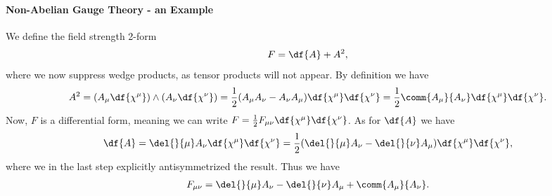 \paragraph{Non-Abelian Gauge Theory - an Example}
We define the field strength 2-form
\begin{align*}
	F = \df{A} + A^{2},
\end{align*}
where we now suppress wedge products, as tensor products will not appear. By definition we have
\begin{align*}
	A^{2} = (A_{\mu}\df{\chi^{\mu}})\wedge(A_{\nu}\df{\chi^{\nu}}) = \frac{1}{2}(A_{\mu}A_{\nu} - A_{\nu}A_{\mu})\df{\chi^{\mu}}\df{\chi^{\nu}} = \frac{1}{2}\comm{A_{\mu}}{A_{\nu}}\df{\chi^{\mu}}\df{\chi^{\nu}}.
\end{align*}
Now, $F$ is a differential form, meaning we can write $F = \frac{1}{2}F_{\mu\nu}\df{\chi^{\mu}}\df{\chi^{\nu}}$. As for $\df{A}$ we have
\begin{align*}
	\df{A} = \del{}{\mu}A_{\nu}\df{\chi^{\mu}}\df{\chi^{\nu}} = \frac{1}{2}(\del{}{\mu}A_{\nu} - \del{}{\nu}A_{\mu})\df{\chi^{\mu}}\df{\chi^{\nu}},
\end{align*}
where we in the last step explicitly antisymmetrized the result. Thus we have
\begin{align*}
	F_{\mu\nu} = \del{}{\mu}A_{\nu} - \del{}{\nu}A_{\mu} + \comm{A_{\mu}}{A_{\nu}}.
\end{align*}

